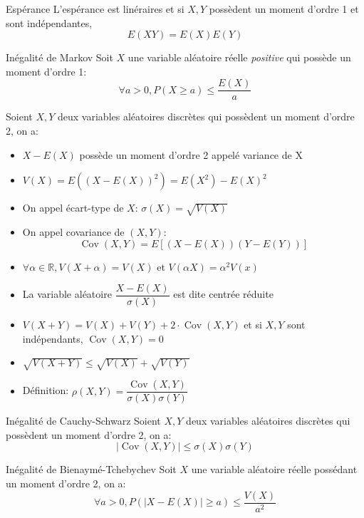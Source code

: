 \documentclass[french, a4paper, 10pt, twocolumn]{article}
\newcommand{\R}{\mathbb{R}}   %
\DeclareMathOperator{\cov}{Cov}
\begin{document}
\begin{theoreme}{Espérance}
  L'espérance est linéraires et si \(X,Y\) possèdent un moment d'ordre 1 et sont indépendantes,
  \[E(XY)=E(X)E(Y)\]
\end{theoreme}

\begin{theoreme}{Inégalité de Markov}
  Soit $X$ une variable aléatoire réelle \emph{positive} qui possède un moment d'ordre 1:
  \[\forall a>0, {P(X\geqslant a)\leqslant \frac{E(X)}{a}}\]
\end{theoreme}

\begin{definition}
  Soient \(X,Y\) deux variables aléatoires discrètes qui possèdent un moment d'ordre 2, on a:
  \begin{itemize}[label=\(\bullet\)]
    \item \(X-E(X)\) possède un moment d'ordre 2 appelé variance de X
    \item \(V(X)=E\left({(X-E(X))}^2\right)=E(X^2)-{E(X)}^2\)
    \item On appel écart-type de \(X\): \(\sigma(X)=\sqrt{V(X)}\)
    \item On appel covariance de \((X,Y)\): \[\cov(X,Y)=E\left[(X-E(X))(Y-E(Y))\right]\]
  \end{itemize}
  \tcblower
  \begin{itemize}
    \item \(\forall \alpha \in \R, V(X+\alpha)=V(X)\) et \(V(\alpha X)=\alpha^2V(x)\)
    \item La variable aléatoire \(\dfrac{X-E(X)}{\sigma(X)}\) est dite centrée réduite
    \item \(V(X+Y)=V(X)+V(Y)+2\cdot\cov(X,Y)\) et si \(X,Y\) sont indépendants, \(\cov(X,Y)=0\)
    \item \(\sqrt{V(X+Y)}\leqslant \sqrt{V(X)}+\sqrt{V(Y)}\)
    \item Définition: \(\rho(X,Y)=\dfrac{\cov(X,Y)}{\sigma(X)\sigma(Y)}\)
  \end{itemize}
\end{definition}

\begin{theoreme}{Inégalité de Cauchy-Schwarz}
  Soient \(X,Y\) deux variables aléatoires discrètes qui possèdent un moment d'ordre 2, on a:
  \[\left\lvert\cov(X,Y)\right\rvert \leqslant \sigma(X)\sigma(Y)\]
\end{theoreme}

\begin{theoreme}{Inégalité de Bienaymé-Tchebychev}
  Soit $X$ une variable aléatoire réelle possédant un moment d'ordre 2, on a:
  \[\forall a>0, P\left(|X-E(X)|\geqslant a\right)\leqslant \frac{V(X)}{a^2}\]
\end{theoreme}
\end{document}
